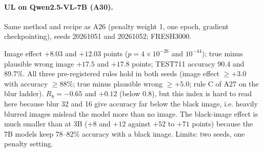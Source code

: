 \paragraph{UL on Qwen2.5-VL-7B (A30).}
Same method and recipe as A26 (penalty weight 1, one epoch, gradient checkpointing), seeds 20261051 and 20261052; FRESH3000.
\begin{center}
\footnotesize
\setlength{\tabcolsep}{3pt}
\end{center}
Image effect $+8.03$ and $+12.03$ points ($p=4\times10^{-26}$ and $10^{-44}$); true minus plausible wrong image $+17.5$ and $+17.8$ points; TEST711 accuracy 90.4 and 89.7\%.
All three pre-registered rules hold in both seeds (image effect $\ge+3.0$ with accuracy $\ge88\%$; true minus plausible wrong $\ge+5.0$; rule C of A27 on the blur ladder).
$R_8=-0.65$ and $+0.12$ (below 0.8), but this index is hard to read here because blur 32 and 16 give accuracy far below the black image, i.e. heavily blurred images mislead the model more than no image.
The black-image effect is much smaller than at 3B ($+8$ and $+12$ against $+52$ to $+71$ points) because the 7B models keep 78--82\% accuracy with a black image.
Limits: two seeds, one penalty setting.

